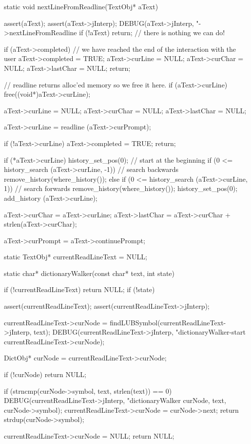 \startCCode
static void nextLineFromReadline(TextObj* aText) {
  assert(aText);
  assert(aText->jInterp);
  DEBUG(aText->jInterp, "->nextLineFromReadline %
  if (!aText) return; // there is nothing we can do!

  if (aText->completed) {
    // we have reached the end of the interaction with the user
    aText->completed = TRUE;
    aText->curLine   = NULL;
    aText->curChar   = NULL;
    aText->lastChar  = NULL;
    return;
  }

  // readline returns alloc'ed memory so we free it here.
  if (aText->curLine) free((void*)aText->curLine);

  aText->curLine  = NULL;
  aText->curChar  = NULL;
  aText->lastChar = NULL;

  aText->curLine = readline (aText->curPrompt);

  if (!aText->curLine) {
    aText->completed = TRUE;
    return;
  }

  if (*aText->curLine) {
    history_set_pos(0); // start at the beginning
    if (0 <= history_search (aText->curLine, -1)) { // search backwards
      remove_history(where_history());
    } else if (0 <= history_search (aText->curLine, 1)) { // search forwards
      remove_history(where_history());
    }
    history_set_pos(0);
    add_history (aText->curLine);
  }

  aText->curChar  = aText->curLine;
  aText->lastChar = aText->curChar + strlen(aText->curChar);

  aText->curPrompt = aText->continuePrompt;
}
\stopCCode

\startCCode
static TextObj* currentReadLineText = NULL;
\stopCCode

\startCCode
static char* dictionaryWalker(const char* text, int state) {
  if (!currentReadLineText) return NULL;
  if (!state) {

    assert(currentReadLineText);
    assert(currentReadLineText->jInterp);

    currentReadLineText->curNode =
      findLUBSymbol(currentReadLineText->jInterp, text);
    DEBUG(currentReadLineText->jInterp,
          "dictionaryWalker-start %
          currentReadLineText->curNode);
  }
  DictObj* curNode = currentReadLineText->curNode;

  if (!curNode) return NULL;

  if (strncmp(curNode->symbol, text, strlen(text)) == 0) {
    DEBUG(currentReadLineText->jInterp,
          "dictionaryWalker %
          curNode, text, curNode->symbol);
    currentReadLineText->curNode = curNode->next;
    return strdup(curNode->symbol);
  }

  currentReadLineText->curNode = NULL;
  return NULL;
}

